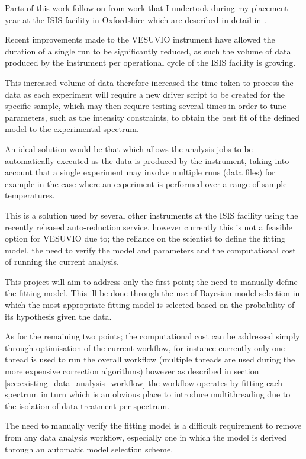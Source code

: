 \documentclass[a4paper]{article}
\begin{document}
Parts of this work follow on from work that I undertook during my placement year
at the ISIS facility in Oxfordshire which are described in detail in
\cite{Nixon2015}.

Recent improvements made to the VESUVIO instrument have allowed the duration of
a single run to be significantly reduced, as such the volume of data produced
by the instrument per operational cycle of the ISIS facility is growing.

This increased volume of data therefore increased the time taken to process the
data as each experiment will require a new driver script to be created for the
specific sample, which may then require testing several times in order to tune
parameters, such as the intensity constraints, to obtain the best fit of the
defined model to the experimental spectrum.

An ideal solution would be that which allows the analysis jobs to be
automatically executed as the data is produced by the instrument, taking into
account that a single experiment may involve multiple runs (data files) for
example in the case where an experiment is performed over a range of sample
temperatures.

This is a solution used by several other instruments at the ISIS facility using
the recently released auto-reduction service, however currently this is not a
feasible option for VESUVIO due to; the reliance on the scientist to define the
fitting model, the need to verify the model and parameters and the computational
cost of running the current analysis.

This project will aim to address only the first point; the need to manually
define the fitting model. This ill be done through the use of Bayesian model
selection in which the most appropriate fitting model is selected based on the
probability of its hypothesis given the data.

As for the remaining two points; the computational cost can be addressed simply
through optimisation of the current workflow, for instance currently only one
thread is used to run the overall workflow (multiple threads are used during the
more expensive correction algorithms) however as described in section
\ref{sec:existing_data_analysis_workflow} the workflow operates by fitting each
spectrum in turn which is an obvious place to introduce multithreading due to
the isolation of data treatment per spectrum.

The need to manually verify the fitting model is a difficult requirement to
remove from any data analysis workflow, especially one in which the model is
derived through an automatic model selection scheme.
\end{document}
